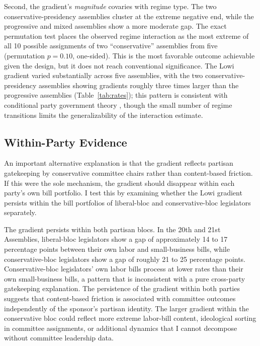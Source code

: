 \documentclass[11pt]{article}
\begin{document}
Second, the gradient's \emph{magnitude} covaries with regime type. The two conservative-presidency assemblies cluster at the extreme negative end, while the progressive and mixed assemblies show a more moderate gap. The exact permutation test places the observed regime interaction as the most extreme of all 10 possible assignments of two ``conservative'' assemblies from five (permutation $p = 0.10$, one-sided). This is the most favorable outcome achievable given the design, but it does not reach conventional significance. The Lowi gradient varied substantially across five assemblies, with the two conservative-presidency assemblies showing gradients roughly three times larger than the progressive assemblies (Table~\ref{tab:rates}); this pattern is consistent with conditional party government theory \citep{aldrich2001}, though the small number of regime transitions limits the generalizability of the interaction estimate.

\subsection{Within-Party Evidence}
\label{sec:results-party}

An important alternative explanation is that the gradient reflects partisan gatekeeping by conservative committee chairs rather than content-based friction. If this were the sole mechanism, the gradient should disappear within each party's own bill portfolio. I test this by examining whether the Lowi gradient persists within the bill portfolios of liberal-bloc and conservative-bloc legislators separately.

The gradient persists within both partisan blocs. In the 20th and 21st Assemblies, liberal-bloc legislators show a gap of approximately 14 to 17 percentage points between their own labor and small-business bills, while conservative-bloc legislators show a gap of roughly 21 to 25 percentage points. Conservative-bloc legislators' own labor bills process at lower rates than their own small-business bills, a pattern that is inconsistent with a pure cross-party gatekeeping explanation. The persistence of the gradient within both parties suggests that content-based friction is associated with committee outcomes independently of the sponsor's partisan identity. The larger gradient within the conservative bloc could reflect more extreme labor-bill content, ideological sorting in committee assignments, or additional dynamics that I cannot decompose without committee leadership data.
\end{document}
